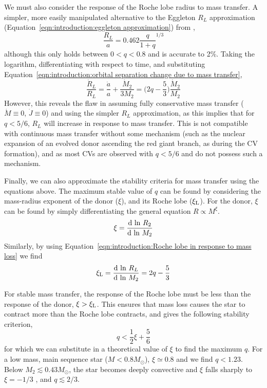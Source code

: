 We must also consider the response of the Roche lobe radius to mass transfer.
A simpler, more easily manipulated alternative to the Eggleton $R_L$ approximation (Equation~\ref{eqn:introduction:eggleton approximation}) from \citep{paczynski1971},
\begin{equation}
    \frac{R_L}{a} = 0.462 \frac{q}{1 + q}^{1/3}
\end{equation}
although this only holds between $0 < q < 0.8$ and is accurate to 2\%. Taking the logarithm, differentiating with respect to time, and substituting Equation~\ref{eqn:introduction:orbital separation change due to mass transfer},
\begin{equation}
    \label{eqn:introduction:Roche lobe in response to mass loss}
    \frac{\dot R_L}{R_L} = \frac{\dot a}{a} + \frac{\dot M_2}{3 M_2} = \bigg ( 2q - \frac{5}{3} \bigg )\frac{\dot M_2}{M_2}
\end{equation}
However, this reveals the flaw in assuming fully conservative mass transfer ($\dot M \equiv 0$, $\dot J \equiv 0$) and using the simpler $R_L$ approximation, as this implies that for $q < 5/6$, $R_L$ will increase in response to mass transfer. This is not compatible with continuous mass transfer without some mechanism (such as the nuclear expansion of an evolved donor ascending the red giant branch, as during the CV formation), and as most CVs are observed with $q < 5/6$ and do not possess such a mechanism. 

Finally, we can also approximate the stability criteria for mass transfer using the equations above. 
The maximum stable value of $q$ can be found by considering the mass-radius exponent of the donor ($\xi$), and its Roche lobe ($\xi_{\rm L}$). For the donor, $\xi$ can be found by simply differentiating the general equation $R \propto M^\xi$.
\begin{equation}
    \xi = \frac{{\rm d\ ln\ }R_2}{{\rm d\ ln\ }M_2}
\end{equation}
Similarly, by using Equation~\ref{eqn:introduction:Roche lobe in response to mass loss} we find
\begin{equation}
    \xi_{\rm L} = \frac{{\rm d\ ln\ }R_L}{{\rm d\ ln\ }M_2} = 2q - \frac{5}{3}
\end{equation}

For stable mass transfer, the response of the Roche lobe must be less than the response of the donor, $\xi > \xi_{\rm L}$. This ensures that mass loss causes the star to contract more than the Roche lobe contracts, and gives the following stability criterion,
\begin{equation}
    q < \frac{1}{2}\xi + \frac{5}{6}
\end{equation}
for which we can substitute in a theoretical value of $\xi$ to find the maximum $q$. For a low mass, main sequence star ($M < 0.8M_\odot$), $\xi \simeq 0.8$ \citep{knigge11} and we find $q < 1.23$. Below $M_2 \lesssim 0.43 M_\odot$, the star becomes deeply convective and $\xi$ falls sharply to $\xi = -1/3$ \citep{paczynski1965,rappaport1982}, and $q \lesssim 2/3$. 



